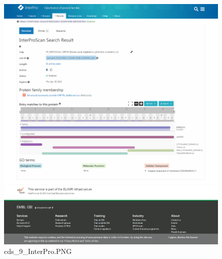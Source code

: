 \documentclass[supercite]{HustGraduPaper}
\begin{document}
	\begin{figure}[H]
		\centering
		\includegraphics[width=1\textwidth]{./material/practice2/cds_9/InterPro.png}
		\caption{cds\_9\_InterPro.PNG}
	\end{figure}
\end{document}
